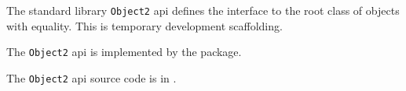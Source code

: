 
The standard library {\tt Object2} api defines the interface to the root class of objects with 
equality.  This is temporary development scaffolding.

The {\tt Object2} api is implemented by the  package.

The {\tt Object2} api source code is in .


